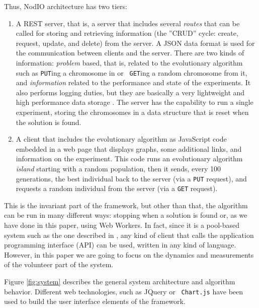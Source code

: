 \documentclass[letterpaper]{article}
\begin{document}


Thus, {\sf NodIO} architecture has two tiers:\begin{enumerate}
\item A REST server, that is, a server that includes several {\em
  routes} 
  that can be called for storing and retrieving information (the ''CRUD'' cycle:
  create, request, update, and delete) from the server. 
  A JSON data format is used for the communication between 
  clients and the server. There are two kinds of information:
  {\em problem} based, that is, related to the
  evolutionary algorithm such as {\tt PUT}ing a chromosome in or {\tt
  GET}ing a random chromosome from it, and {\em information} related
  to the performance and state of the experiments. It also performs logging
  duties, but they are basically a very lightweight and high performance
  data storage \citep{jj:idc:lowcost}.
  The server has the capability to
  run a single experiment, storing the chromosomes in a data structure
  that is reset when the solution is found.
\item A client that includes the evolutionary algorithm as
  JavaScript code embedded in a web page that displays graphs, some
  additional links, and information on the experiment. This code runs
  an evolutionary algorithm {\em island} starting with a random
  population, then it sends, every 100 generations, the best individual
  back to the server (via a {\tt PUT} request), and requests a random
  individual from the server (via a {\tt GET} request). %
\end{enumerate}


  This is the invariant part of the framework, but other than that,
  the algorithm can be run in many different ways: 
  stopping when a solution is found or, as we have done in this paper,
  using Web Workers. In fact, since it is a pool-based system such as
  the one described in \citep{LNCS86720702}, any kind of client that
  calls the application programming interface (API) can be used, %
  written in any kind of language. However, in this paper we are going
  to focus on the dynamics and measurements of the volunteer part of
  the system. 


Figure \ref{fig:system} describes the general system architecture and
algorithm behavior. Different web technologies, such as JQuery or {\tt
  Chart.js} have
been used to build the user interface elements of the framework.
\end{document}
